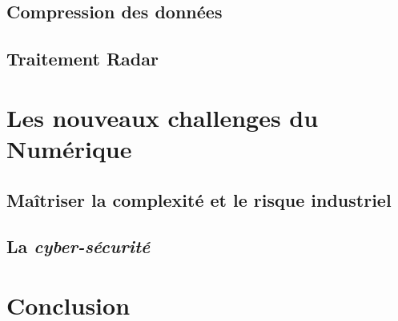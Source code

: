 \subsection{Compression des données}

\subsection{Traitement Radar}

\section{Les nouveaux challenges du Numérique}
\subsection{Maîtriser la complexité et le risque industriel}
\subsection{La {\it cyber-sécurité}}

\section{Conclusion}
